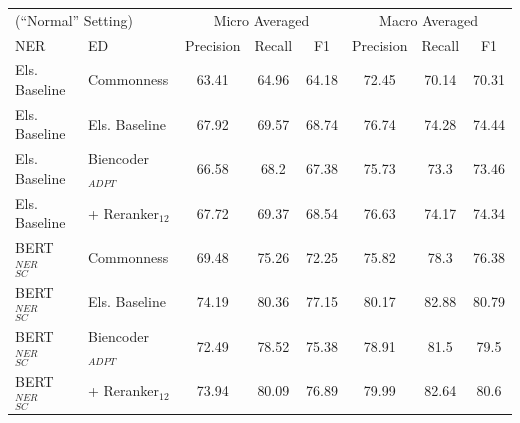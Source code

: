 \documentclass{report}
\theoremstyle{definition}
\theoremstyle{remark}
\begin{document}
\begin{table}[H]
    \centering
    \begin{tabular}{l l c c c| c c c}
    \multicolumn{2}{l}{(``Normal'' Setting)}&\multicolumn{3}{c|}{Micro Averaged}&\multicolumn{3}{c}{Macro Averaged} \\
    NER & ED &Precision&Recall&F1&Precision&Recall&F1\\
    \hline
    Els. Baseline & Commonness & 63.41&64.96&64.18&72.45&70.14&	70.31\\
    Els. Baseline & Els. Baseline & 67.92&69.57&68.74&76.74&74.28&	74.44\\
    Els. Baseline & Biencoder$_{ADPT}$ &66.58&68.2&67.38&75.73&73.3&	73.46\\
    Els. Baseline  & + Reranker$_{12}$ &67.72&69.37&68.54&76.63&74.17&74.34\\
    BERT$_{SC}^{NER}$ & Commonness & 69.48&75.26&72.25&75.82&78.3&	76.38\\
    BERT$_{SC}^{NER}$ & Els. Baseline & 74.19&80.36&77.15&80.17&82.88&	80.79\\
    BERT$_{SC}^{NER}$ & Biencoder$_{ADPT}$ &72.49&78.52&75.38&78.91&81.5&	79.5\\
    BERT$_{SC}^{NER}$ & + Reranker$_{12}$ & 73.94&	80.09&	76.89&	79.99&	82.64&	80.6\\
    \end{tabular}
    

\end{table}
\end{document}
